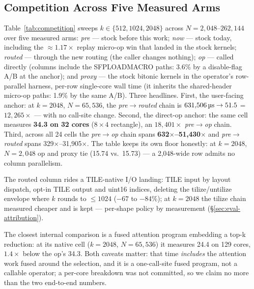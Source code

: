 \subsection{Competition Across Five Measured Arms}
\label{sec:eval-competition}

Table~\ref{tab:competition} sweeps $k \in \{512, 1024, 2048\}$ across
$N = 2{,}048$--$262{,}144$ over five measured arms: \emph{pre} --- stock
\ttnntopk before this work; \emph{now} --- stock \ttnntopk today,
including the ${\approx}1.17\times$ replay micro-op win that landed in
the stock kernels; \emph{routed} --- \ttnntopk through the new routing (the caller
changes nothing); \emph{op} --- \topkop called directly (columns
include the SFPLOADMACRO paths: 3.6\% by a disable-flag A/B at the
anchor); and \emph{proxy} ---
the stock bitonic kernels in the operator's row-parallel
harness, per-row single-core wall time (it inherits the shared-header
micro-op paths: 1.9\% by the same A/B). Three headlines. First, the user-facing anchor: at $k{=}2048$,
$N{=}65{,}536$, the \emph{pre}$\to$\emph{routed} chain is
$631{,}506\,\text{\textmu s} \to 51.5$\us{} = $12{,}265\times$ --- with no
call-site change. Second, the direct-op anchor: the same cell measures
\textbf{34.3\us{} on 32 cores} ($8{\times}4$ rectangle), an
$18{,}401\times$ \emph{pre}$\to$\emph{op} chain. Third, across all 24
cells the \emph{pre}$\to$\emph{op} chain spans
\textbf{632$\times$--51,430$\times$} and \emph{pre}$\to$\emph{routed}
spans 329$\times$--31,905$\times$. The table
keeps its own floor honestly: at $k{=}2048$, $N{=}2{,}048$ op and proxy
tie (15.74 vs.\ 15.73\us{}) --- a 2,048-wide row admits no column
parallelism.

The routed column rides a TILE-native I/O landing: TILE input by
layout dispatch, opt-in TILE output and uint16 indices, deleting the
tilize/untilize envelope where $k$ rounds to
${\leq}1024$ ($-67$ to $-84\%$); at $k{=}2048$ the tilize chain
measured cheaper and is kept --- per-shape policy by measurement
(\S\ref{sec:eval-attribution}).

The closest internal comparison is a fused attention program embedding
a top-k reduction: at its native cell ($k{=}2048$,
$N{=}65{,}536$) it measures 24.4\us{} on 129 cores, $1.4\times$ below
the op's 34.3\us{}. Both caveats matter: that time \emph{includes} the
attention work fused around the selection, and it is a one-call-site
fused program, not a callable operator; a per-core breakdown was not
committed, so we claim no more than the two end-to-end numbers.

